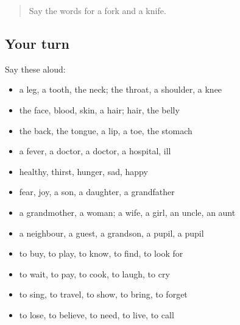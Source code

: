 \label{lesson:GE-R79-first-pass-the-body-people-and-food}



\begin{quote}
Say the words for a fork and a knife.
\end{quote}

\subsection*{Your turn}
Say these aloud:

\begin{itemize}
\raggedright
  \item a leg, a tooth, the neck; the throat, a shoulder, a knee
  \item the face, blood, skin, a hair; hair, the belly
  \item the back, the tongue, a lip, a toe, the stomach
  \item a fever, a doctor, a doctor, a hospital, ill
  \item healthy, thirst, hunger, sad, happy
  \item fear, joy, a son, a daughter, a grandfather
  \item a grandmother, a woman; a wife, a girl, an uncle, an aunt
  \item a neighbour, a guest, a grandson, a pupil, a pupil
  \item to buy, to play, to know, to find, to look for
  \item to wait, to pay, to cook, to laugh, to cry
  \item to sing, to travel, to show, to bring, to forget
  \item to lose, to believe, to need, to live, to call
\end{itemize}

